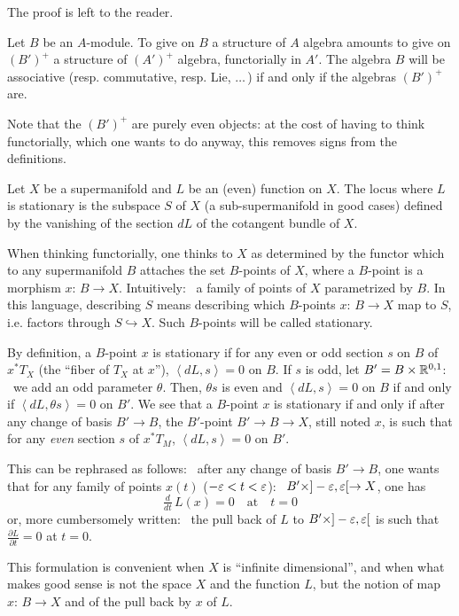 The proof is left to the reader.

Let $B$ be an $A$-module.
To give on $B$ a structure of $A$ algebra amounts to
give on $(B')^{\plus}$ a structure of $(A')^{\plus}$
algebra, functorially in $A'$.
The algebra $B$ will be associative (resp. commutative,
resp. Lie, $\ldots\,$) if and only if the algebras
$(B')^{\plus}$ are.
\endproclaim

Note that the $(B')^{\plus}$ are purely even objects: at
the cost of having to think functorially, which one
wants to do anyway, this removes signs from the
definitions.

Let $X$ be a supermanifold and $L$ be an (even) function
on $X$.
The locus where $L$ is stationary is the subspace $S$ of
$X$ (a sub-supermanifold in good cases) defined by the
vanishing of the section $dL$ of the cotangent bundle of
$X$.

When thinking functorially, one thinks to $X$ as
determined by the functor which to any supermanifold $B$
attaches the set $B$-points of $X$,
where a $B$-point is a morphism $x\colon\,B\to X$.
Intuitively: \ a family of points of $X$ parametrized by
$B$.
In this language, describing $S$ means describing which
$B$-points $x\colon\, B\to X$ map to $S$, i.e. factors
through $S\hookrightarrow X$.
Such $B$-points will be called stationary.

By definition, a $B$-point $x$ is stationary if for
any even or odd section $s$ on $B$ of $x^*T_X$ (the
``fiber of $T_X$ at $x$''), $\left<dL,s\right>=0$ on
$B$.
If $s$ is odd, let $B'=B\times{\Bbb R}^{0,1}$: \ 
we add an odd parameter $\theta$.
Then, $\theta s$ is even and $\left<dL,s\right>=0$ on
$B$ if and only if $\left<dL,\theta s\right>=0$ on $B'$.
We see that a 
$B$-point $x$ is stationary if and only if after any
change of basis $B'\to B$, the  $B'$-point $B'\to B\to
X$, still noted $x$, is such that for any
{\it even} section $s$ of $x^*T_M$,
$\left<dL,s\right>=0$ on $B'$.

This can be rephrased as follows: \ 
after any change of basis $B'\to B$, one wants that for
any family of points $x(t)$ ($-{\varepsilon}<t<{\varepsilon}$): \
$B'\times]-{\varepsilon},{\varepsilon}[\to X$, one has
$$
\tfrac{d}{dt}\,L(x)=0\quad\text{at}\quad t=0
$$
or, more cumbersomely written: \ the pull back of $L$ to
$B'\times]-{\varepsilon},{\varepsilon}[$ is such that
$\frac{\partial L}{\partial t}=0$ at $t=0$.

This formulation is convenient when $X$ is ``infinite
dimensional'', and when what makes good sense is not the
space $X$ and the function $L$, but the notion of map
$x\colon\,B\to X$ and of the pull back by $x$ of $L$.
\endexample

